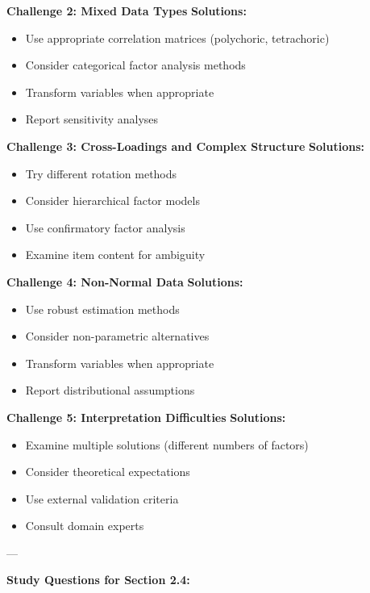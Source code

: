\documentclass[
]{article}
\begin{document}
\textbf{Challenge 2: Mixed Data Types} \textbf{Solutions:}

\begin{itemize}
\item
  Use appropriate correlation matrices (polychoric, tetrachoric)
\item
  Consider categorical factor analysis methods
\item
  Transform variables when appropriate
\item
  Report sensitivity analyses
\end{itemize}

\textbf{Challenge 3: Cross-Loadings and Complex Structure}
\textbf{Solutions:}

\begin{itemize}
\item
  Try different rotation methods
\item
  Consider hierarchical factor models
\item
  Use confirmatory factor analysis
\item
  Examine item content for ambiguity
\end{itemize}

\textbf{Challenge 4: Non-Normal Data} \textbf{Solutions:}

\begin{itemize}
\item
  Use robust estimation methods
\item
  Consider non-parametric alternatives
\item
  Transform variables when appropriate
\item
  Report distributional assumptions
\end{itemize}

\textbf{Challenge 5: Interpretation Difficulties} \textbf{Solutions:}

\begin{itemize}
\item
  Examine multiple solutions (different numbers of factors)
\item
  Consider theoretical expectations
\item
  Use external validation criteria
\item
  Consult domain experts
\end{itemize}

---

\textbf{Study Questions for Section 2.4:}
\end{document}
